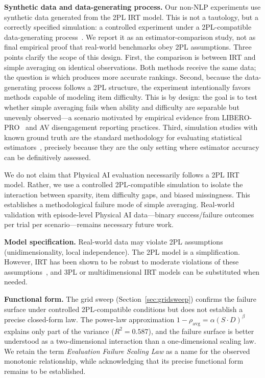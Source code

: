 \documentclass[11pt,a4paper]{article}
\begin{document}
\textbf{Synthetic data and data-generating process.} Our non-NLP experiments use synthetic data generated from the 2PL IRT model. This is not a tautology, but a correctly specified simulation: a controlled experiment under a 2PL-compatible data-generating process~\cite{morris2019}. We report it as an estimator-comparison study, not as final empirical proof that real-world benchmarks obey 2PL assumptions. Three points clarify the scope of this design. First, the comparison is between IRT and simple averaging on identical observations. Both methods receive the same data; the question is which produces more accurate rankings. Second, because the data-generating process follows a 2PL structure, the experiment intentionally favors methods capable of modeling item difficulty. This is by design: the goal is to test whether simple averaging fails when ability and difficulty are separable but unevenly observed---a scenario motivated by empirical evidence from LIBERO-PRO~\cite{zhou2025b} and AV disengagement reporting practices. Third, simulation studies with known ground truth are the standard methodology for evaluating statistical estimators~\cite{deayala2009,morris2019}, precisely because they are the only setting where estimator accuracy can be definitively assessed.

We do not claim that Physical AI evaluation necessarily follows a 2PL IRT model. Rather, we use a controlled 2PL-compatible simulation to isolate the interaction between sparsity, item difficulty gaps, and biased missingness. This establishes a methodological failure mode of simple averaging. Real-world validation with episode-level Physical AI data---binary success/failure outcomes per trial per scenario---remains necessary future work.

\textbf{Model specification.} Real-world data may violate 2PL assumptions (unidimensionality, local independence). The 2PL model is a simplification. However, IRT has been shown to be robust to moderate violations of these assumptions~\cite{embretson2000}, and 3PL or multidimensional IRT models can be substituted when needed.

\textbf{Functional form.} The grid sweep (Section~\ref{sec:gridsweep}) confirms the failure surface under controlled 2PL-compatible conditions but does not establish a precise closed-form law. The power-law approximation $1 - \rho_{\text{avg}} = \alpha (S \cdot D)^{\beta}$ explains only part of the variance ($R^2 = 0.587$), and the failure surface is better understood as a two-dimensional interaction than a one-dimensional scaling law. We retain the term \emph{Evaluation Failure Scaling Law} as a name for the observed monotonic relationship, while acknowledging that its precise functional form remains to be established.
\end{document}
